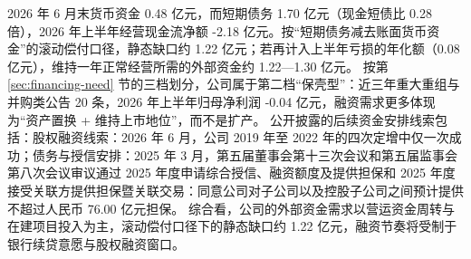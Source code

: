  2026 年 6 月末货币资金 0.48 亿元，而短期债务 1.70 亿元（现金短债比 0.28 倍），2026 年上半年经营现金流净额 -2.18 亿元。按“短期债务减去账面货币资金”的滚动偿付口径，静态缺口约 1.22 亿元；若再计入上半年亏损的年化额（0.08 亿元），维持一年正常经营所需的外部资金约 1.22---1.30 亿元。 按第 \ref{sec:financing-need} 节的三档划分，公司属于第二档“保壳型”：近三年重大重组与并购类公告 20 条，2026 年上半年归母净利润 -0.04 亿元，融资需求更多体现为“资产置换 + 维持上市地位”，而不是扩产。 公开披露的后续资金安排线索包括：股权融资线索：2026 年 6 月，公司 2019 年至 2022 年的四次定增中仅一次成功；债务与授信安排：2025 年 3 月，第五届董事会第十三次会议和第五届监事会第八次会议审议通过 2025 年度申请综合授信、融资额度及提供担保和 2025 年度接受关联方提供担保暨关联交易：同意公司对子公司以及控股子公司之间预计提供不超过人民币 76.00 亿元担保。 综合看，公司的外部资金需求以营运资金周转与在建项目投入为主，滚动偿付口径下的静态缺口约 1.22 亿元，融资节奏将受制于银行续贷意愿与股权融资窗口。




